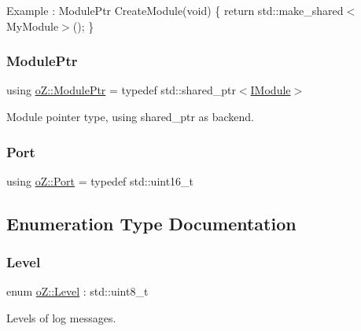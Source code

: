 Example \+: Module\+Ptr Create\+Module(void) \{ return std\+::make\+\_\+shared$<$\+My\+Module$>$(); \} \mbox{\label{namespaceo_z_af5a56aaaee027504979038f38991adcf}} 
\subsubsection{\texorpdfstring{ModulePtr}{ModulePtr}}
{\footnotesize\ttfamily using \mbox{\hyperlink{namespaceo_z_af5a56aaaee027504979038f38991adcf}{o\+Z\+::\+Module\+Ptr}} = typedef std\+::shared\+\_\+ptr$<$\mbox{\hyperlink{classo_z_1_1_i_module}{I\+Module}}$>$}



Module pointer type, using shared\+\_\+ptr as backend. 

\mbox{\label{namespaceo_z_afeccb82d451972ba3b7d2a32b066b30b}} 
\subsubsection{\texorpdfstring{Port}{Port}}
{\footnotesize\ttfamily using \mbox{\hyperlink{namespaceo_z_afeccb82d451972ba3b7d2a32b066b30b}{o\+Z\+::\+Port}} = typedef std\+::uint16\+\_\+t}



\subsection{Enumeration Type Documentation}
\mbox{\label{namespaceo_z_a72fc7662d5f07391ac6f0a5699014bfa}} 
\subsubsection{\texorpdfstring{Level}{Level}}
{\footnotesize\ttfamily enum \mbox{\hyperlink{namespaceo_z_a72fc7662d5f07391ac6f0a5699014bfa}{o\+Z\+::\+Level}} \+: std\+::uint8\+\_\+t}



Levels of log messages. 

